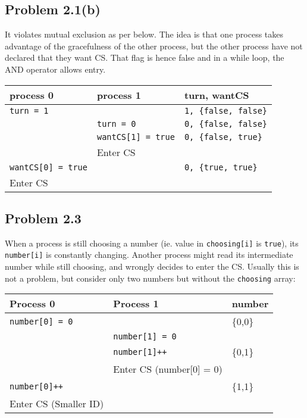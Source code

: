 \documentclass[11pt]{article}
\begin{document}
\subsection{Problem 2.1(b)}
\label{sec:org631546d}
It violates mutual exclusion as per below. The idea is that one process takes
advantage of the gracefulness of the other process, but the other process have
not declared that they want CS. That flag is hence false and in a while loop,
the AND operator allows entry.
\begin{center}
\begin{tabular}{lll}
\hline
process 0 & process 1 & turn, wantCS\\
\hline
\texttt{turn = 1} &  & \texttt{1, \{false, false\}}\\
 & \texttt{turn = 0} & \texttt{0, \{false, false\}}\\
 & \texttt{wantCS[1] = true} & \texttt{0, \{false, true\}}\\
 & Enter CS & \\
\texttt{wantCS[0] = true} &  & \texttt{0, \{true, true\}}\\
Enter CS &  & \\
\hline
\end{tabular}
\end{center}
\subsection{Problem 2.3}
\label{sec:org3edfde1}
When a process is still choosing a number (ie. value in \texttt{choosing[i]} is
\texttt{true}), its \texttt{number[i]} is constantly changing. Another process might read its
intermediate number while still choosing, and wrongly decides to enter the CS.
Usually this is not a problem, but consider only two numbers but without the
\texttt{choosing} array:
\begin{center}
\begin{tabular}{lll}
\hline
Process 0 & Process 1 & number\\
\hline
\texttt{number[0] = 0} &  & \{0,0\}\\
 & \texttt{number[1] = 0} & \\
 & \texttt{number[1]++} & \{0,1\}\\
 & Enter CS (number[0] = 0) & \\
\texttt{number[0]++} &  & \{1,1\}\\
Enter CS (Smaller ID) &  & \\
\hline
\end{tabular}
\end{center}
\end{document}
